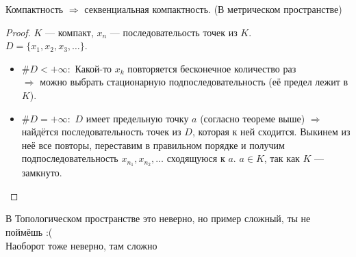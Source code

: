 \follow Компактность $\Longrightarrow$ секвенциальная компактность. (В метрическом пространстве)
\begin{proof}
    $K$ --- компакт, $x_n$ --- последовательость точек из $K$. \\
    $D = \{x_1,x_2,x_3,\dots \}$.
    \begin{itemize}
        \item[] $\#D < +\infty:$ Какой-то $x_k$ повторяется бесконечное количество раз \\
        $\Longrightarrow$ можно выбрать стационарную подпоследовательность (её предел лежит в $K$).
        \item[] $\#D = +\infty:$ $D$ имеет предельную точку $a$ (согласно теореме выше) $\Longrightarrow$ найдётся последовательность точек
        из $D$, которая к ней сходится. Выкинем из неё все повторы, переставим в правильном порядке и получим
        подпоследовательность $x_{n_1}, x_{n_2},\dots $ сходящуюся к $a$. $a \in K$, так как $K$ --- замкнуто.
    \end{itemize}
\end{proof}

\notice \quad

В Топологическом пространстве это неверно, но пример сложный, ты не поймёшь :( \\
Наоборот тоже неверно, там сложно

